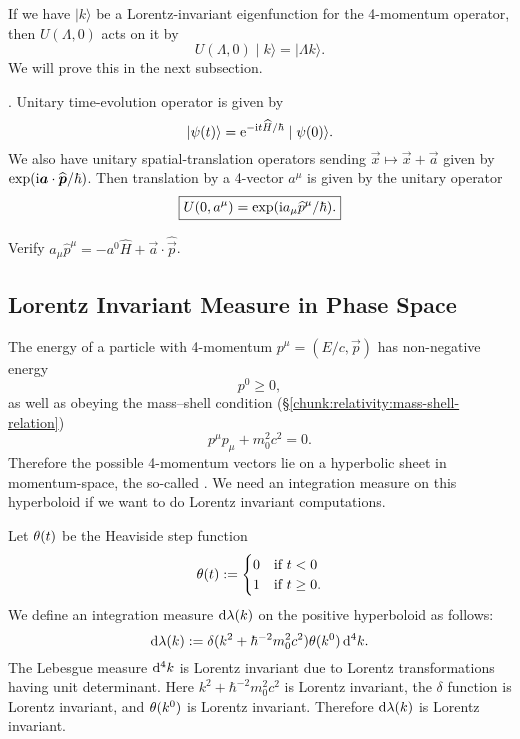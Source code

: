 If we have $|k\rangle$ be a Lorentz-invariant eigenfunction for the 4-momentum
operator, then $U(\Lambda,0)$ acts on it by
\begin{equation}
U(\Lambda,0)\mid k\rangle = |\Lambda k\rangle.
\end{equation}
We will prove this in the next subsection.

.
Unitary time-evolution operator is given by
\begin{equation}
  |\psi(t)\rangle = \mathrm{e}^{-\mathrm{i} t\widehat{H}/\hbar}\mid\psi(0)\rangle.
\end{equation}
We also have unitary spatial-translation operators sending
$\vec{x}\mapsto\vec{x}+\vec{a}$ given by
$\exp(\mathrm{i}\boldsymbol{a}\cdot\widehat{\boldsymbol{p}}/\hbar)$. Then translation by a
4-vector $a^{\mu}$ is given by the unitary operator
\begin{equation}
\boxed{U(0,a^{\mu}) = \exp(\mathrm{i} a_{\mu}\widehat{p}^{\mu}/\hbar).}
\end{equation}

\begin{exercise}
Verify $a_{\mu}\widehat{p}^{\mu}=-a^{0}\widehat{H}+\vec{a}\cdot\widehat{\vec{p}}$.
\end{exercise}

\subsection{Lorentz Invariant Measure in Phase Space}

\M
The energy of a particle with 4-momentum $p^{\mu}=(E/c,\vec{p})$ has
non-negative energy
\begin{equation}
p^{0}\geq0,
\end{equation}
as well as obeying the mass--shell condition (\S\ref{chunk:relativity:mass-shell-relation})
\begin{equation}
p^{\mu}p_{\mu}+m_{0}^{2}c^{2}=0.
\end{equation}
Therefore the possible 4-momentum vectors lie on a hyperbolic sheet in
momentum-space, the so-called . We need an
integration measure on this hyperboloid if we want to do Lorentz
invariant computations.

Let $\theta(t)$ be the Heaviside step function
\begin{equation}
\theta(t):=\begin{cases}0 & \mbox{if }t<0\\
1 & \mbox{if }t\geq0.
\end{cases}
\end{equation}
We define an integration measure $\mathrm{d}\lambda(k)$ on the positive
hyperboloid as follows:
\begin{equation}\label{eq:rqm:single-particle:lorentz-invariant-phase-space-measure}
\mathrm{d}\lambda(k) := \delta(k^{2}+\hbar^{-2}m_{0}^{2}c^{2})\theta(k^{0})\,\mathrm{d}^{4}k.
\end{equation}
The Lebesgue measure $\mathrm{d}^{4}k$ is Lorentz invariant due to Lorentz
transformations having unit determinant. Here
$k^{2}+\hbar^{-2}m_{0}^{2}c^{2}$ is Lorentz 
invariant, the $\delta$ function is Lorentz invariant, and
$\theta(k^{0})$ is Lorentz invariant. Therefore $\mathrm{d}\lambda(k)$
is Lorentz invariant.

